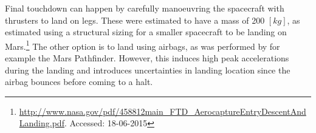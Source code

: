 Final touchdown can happen by carefully manoeuvring the spacecraft with thrusters to land on legs. These were estimated to have a mass of 200 $[kg]$, as estimated using a structural sizing for a smaller spacecraft to be landing on Mars.\footnote{\url{http://www.nasa.gov/pdf/458812main_FTD_AerocaptureEntryDescentAndLanding.pdf}. Accessed: 18-06-2015} The other option is to land using airbags, as was performed by for example the Mars Pathfinder. However, this induces high peak accelerations during the landing and introduces uncertainties in landing location since the airbag bounces before coming to a halt.
